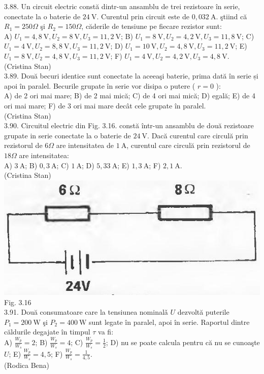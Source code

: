 3.88. Un circuit electric constă dintr-un ansamblu de trei rezistoare în serie, conectate la o baterie de $24 \mathrm{~V}$. Curentul prin circuit este de $0,032 \mathrm{~A}$. ştiind că $R_{1}=250 \Omega$ şi $R_{2}=150 \Omega$, căderile de tensiune pe fiecare rezistor sunt:\\ A) $U_{1}=4,8 \mathrm{~V} , U_{2}=8 \mathrm{~V} , U_{3}=11,2 \mathrm{~V}$; B) $U_{1}=8 \mathrm{~V} , U_{2}=4,2 \mathrm{~V} , U_{3}=11,8 \mathrm{~V}$; C) $U_{1}=4 \mathrm{~V} , U_{2}=8,8 \mathrm{~V} , U_{3}=11,2 \mathrm{~V}$; D) $U_{1}=10 \mathrm{~V} , U_{2}=4,8 \mathrm{~V} , U_{3}=11,2 \mathrm{~V}$; E) $U_{1}=8 \mathrm{~V} , U_{2}=4,8 \mathrm{~V} , U_{3}=11,2 \mathrm{~V}$; F) $U_{1}=4 \mathrm{~V} , U_{2}=4,2 \mathrm{~V} , U_{3}=4,8 \mathrm{~V}$.\\ (Cristina Stan)\\

3.89. Două becuri identice sunt conectate la aceeaşi baterie, prima dată în serie și apoi în paralel. Becurile grupate în serie vor disipa o putere ( $r=0$ ):\\ A) de 2 ori mai mare; B) de 2 mai mică; C) de 4 ori mai mică; D) egală; E) de 4 ori mai mare; F) de 3 ori mai mare decât cele grupate în paralel.\\ (Cristina Stan)\\

3.90. Circuitul electric din Fig. 3.16. constă într-un ansamblu de două rezistoare grupate in serie conectate la o baterie de $24 \mathrm{~V}$. Dacă curentul care circulă prin rezistorul de $6 \Omega$ are intensitatea de $1 \mathrm{~A}$, curentul care circulă prin rezistorul de $18 \Omega$ are intensitatea:\\ A) $3 \mathrm{~A}$; B) $0,3 \mathrm{~A}$; C) $1 \mathrm{~A}$; D) $5,33 \mathrm{~A}$; E) $1,3 \mathrm{~A}$; F) $2,1 \mathrm{~A}$.\\ (Cristina Stan)\\ \includegraphics[width=0.4\linewidth]{images/2025_07_01_5b3ff9fa0d508c8e9f17g-163} Fig. 3.16\\

3.91. Două consumatoare care la tensiunea nominalǎ $U$ dezvoltă puterile $P_{1}=200 \mathrm{~W}$ şi $P_{2}=400 \mathrm{~W}$ sunt legate în paralel, apoi în serie. Raportul dintre căldurile degajate în timpul $\tau$ va fi:\\ A) $\frac{W_{p}}{W_{s}}=2$; B) $\frac{W_{p}}{W_{s}}=4$; C) $\frac{W_{p}}{W_{s}}=\frac{1}{2}$; D) nu se poate calcula pentru că nu se cunoaşte $U$; E) $\frac{W_{p}}{W_{s}}=4,5$; F) $\frac{W_{p}}{W_{s}}=\frac{1}{4,5}$.\\ (Rodica Bena)\\

